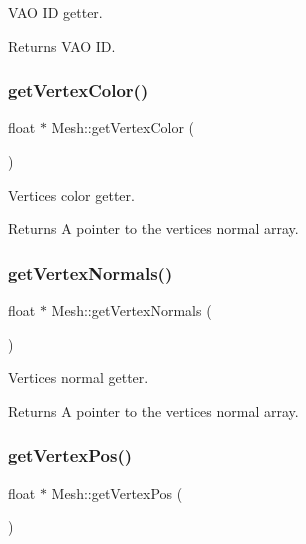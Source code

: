 V\+AO ID getter. 

\begin{DoxyReturn}{Returns}
V\+AO ID. 
\end{DoxyReturn}
\mbox{\label{class_mesh_ade2dd22f7cbe37df8e51ba65c800bbc8}} 
\subsubsection{\texorpdfstring{get\+Vertex\+Color()}{getVertexColor()}}
{\footnotesize\ttfamily float $\ast$ Mesh\+::get\+Vertex\+Color (\begin{DoxyParamCaption}{ }\end{DoxyParamCaption})}



Vertices color getter. 

\begin{DoxyReturn}{Returns}
A pointer to the vertices normal array. 
\end{DoxyReturn}
\mbox{\label{class_mesh_ab16f1115ed7865c9e7322c85e2d785af}} 
\subsubsection{\texorpdfstring{get\+Vertex\+Normals()}{getVertexNormals()}}
{\footnotesize\ttfamily float $\ast$ Mesh\+::get\+Vertex\+Normals (\begin{DoxyParamCaption}{ }\end{DoxyParamCaption})}



Vertices normal getter. 

\begin{DoxyReturn}{Returns}
A pointer to the vertices normal array. 
\end{DoxyReturn}
\mbox{\label{class_mesh_a2345e6c20aa6a0f05521b8aeb62203f4}} 
\subsubsection{\texorpdfstring{get\+Vertex\+Pos()}{getVertexPos()}}
{\footnotesize\ttfamily float $\ast$ Mesh\+::get\+Vertex\+Pos (\begin{DoxyParamCaption}{ }\end{DoxyParamCaption})}



